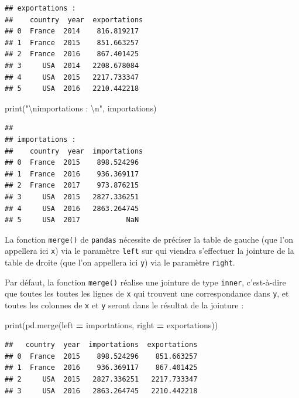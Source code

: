 \documentclass[12pt,]{book}
\newenvironment{Shaded}{\begin{snugshade}}{\end{snugshade}}
\newcommand{\CharTok}[1]{\textcolor[rgb]{0.31,0.60,0.02}{#1}}
\newcommand{\StringTok}[1]{\textcolor[rgb]{0.31,0.60,0.02}{#1}}
\newcommand{\OperatorTok}[1]{\textcolor[rgb]{0.81,0.36,0.00}{\textbf{#1}}}
\newcommand{\BuiltInTok}[1]{#1}
\newcommand{\NormalTok}[1]{#1}
\numberwithin{equation}{section}
\numberwithin{countremarque}{section}
\begin{document}
\begin{lstlisting}
## exportations : 
##    country  year  exportations
## 0  France  2014    816.819217
## 1  France  2015    851.663257
## 2  France  2016    867.401425
## 3     USA  2014   2208.678084
## 4     USA  2015   2217.733347
## 5     USA  2016   2210.442218
\end{lstlisting}

\begin{Shaded}
\begin{Highlighting}[]
\BuiltInTok{print}\NormalTok{(}\StringTok{"}\CharTok{\textbackslash{}n}\StringTok{importations : }\CharTok{\textbackslash{}n}\StringTok{"}\NormalTok{, importations)}
\end{Highlighting}
\end{Shaded}

\begin{lstlisting}
## 
## importations : 
##    country  year  importations
## 0  France  2015    898.524296
## 1  France  2016    936.369117
## 2  France  2017    973.876215
## 3     USA  2015   2827.336251
## 4     USA  2016   2863.264745
## 5     USA  2017           NaN
\end{lstlisting}

La fonction \texttt{merge()} de \texttt{pandas} nécessite de préciser la
table de gauche (que l'on appellera ici \texttt{x}) via le paramètre
\texttt{left} sur qui viendra s'effectuer la jointure de la table de
droite (que l'on appellera ici \texttt{y}) via le paramètre
\texttt{right}.

Par défaut, la fonction \texttt{merge()} réalise une jointure de type
\texttt{inner}, c'est-à-dire que toutes les toutes les lignes de
\texttt{x} qui trouvent une correspondance dans \texttt{y}, et toutes
les colonnes de \texttt{x} et \texttt{y} seront dans le résultat de la
jointure :

\begin{Shaded}
\begin{Highlighting}[]
\BuiltInTok{print}\NormalTok{(pd.merge(left }\OperatorTok{=}\NormalTok{ importations, right }\OperatorTok{=}\NormalTok{ exportations))}
\end{Highlighting}
\end{Shaded}

\begin{lstlisting}
##   country  year  importations  exportations
## 0  France  2015    898.524296    851.663257
## 1  France  2016    936.369117    867.401425
## 2     USA  2015   2827.336251   2217.733347
## 3     USA  2016   2863.264745   2210.442218
\end{lstlisting}
\end{document}
